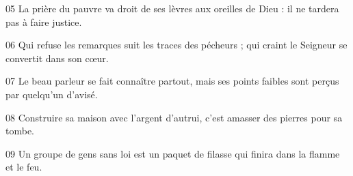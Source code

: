 
05 La prière du pauvre va droit de ses lèvres aux oreilles de Dieu : il ne tardera pas à faire justice.

06 Qui refuse les remarques suit les traces des pécheurs ; qui craint le Seigneur se convertit dans son cœur.

07 Le beau parleur se fait connaître partout, mais ses points faibles sont perçus par quelqu’un d’avisé.

08 Construire sa maison avec l’argent d’autrui, c’est amasser des pierres pour sa tombe.

09 Un groupe de gens sans loi est un paquet de filasse qui finira dans la flamme et le feu.
